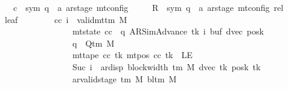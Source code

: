 \begin{isabellebody}
\ \ \ \ \ c{}\ {\isacharcolon}{\kern0pt}{\isacharcolon}{\kern0pt}\ {\isachardoublequoteopen}{\isacharparenleft}{\kern0pt}sym{}{\isacharcomma}{\kern0pt}\ {\isacharprime}{\kern0pt}q\ {\isasymtimes}\ {\isacharprime}{\kern0pt}a\ ar{\isacharunderscore}{\kern0pt}stage{\isacharparenright}{\kern0pt}\ mt{\isacharunderscore}{\kern0pt}config{\isachardoublequoteclose}\isanewline
\ \ \ \ \ R{\isacharprime}{\kern0pt}\ {\isacharcolon}{\kern0pt}{\isacharcolon}{\kern0pt}\ {\isachardoublequoteopen}{\isacharparenleft}{\kern0pt}sym{}{\isacharcomma}{\kern0pt}\ {\isacharprime}{\kern0pt}q\ {\isasymtimes}\ {\isacharprime}{\kern0pt}a\ ar{\isacharunderscore}{\kern0pt}stage{\isacharparenright}{\kern0pt}\ mt{\isacharunderscore}{\kern0pt}config\ rel{\isachardoublequoteclose}\isanewline
\ \ \ leaf{\isacharcolon}{\kern0pt}\isanewline
\ \ \ \ \ \ \ \ {\isachardoublequoteopen}{\isasymAnd}cc\ i{\isachardot}{\kern0pt}\ {\isasymlbrakk}\ valid{\isacharunderscore}{\kern0pt}mttm\ M{\isacharsemicolon}{\kern0pt}\isanewline
\ \ \ \ \ \ \ \ \ \ \ \ \ \ \ \ \ \ \ mt{\isacharunderscore}{\kern0pt}state\ cc\ {\isacharequal}{\kern0pt}\ {\isacharparenleft}{\kern0pt}q{\isacharcomma}{\kern0pt}\ AR{\isacharunderscore}{\kern0pt}SimAdvance{\isacharcomma}{\kern0pt}\ tk{\isacharcomma}{\kern0pt}\ i{\isacharcomma}{\kern0pt}\ buf{\isacharcomma}{\kern0pt}\ dvec{\isacharcomma}{\kern0pt}\ posk{\isacharparenright}{\kern0pt}{\isacharsemicolon}{\kern0pt}\isanewline
\ \ \ \ \ \ \ \ \ \ \ \ \ \ \ \ \ \ \ q\ {\isasymin}\ Q{\isacharunderscore}{\kern0pt}tm\ M{\isacharsemicolon}{\kern0pt}\isanewline
\ \ \ \ \ \ \ \ \ \ \ \ \ \ \ \ \ \ \ mt{\isacharunderscore}{\kern0pt}tape\ cc\ tk\ {\isacharparenleft}{\kern0pt}mt{\isacharunderscore}{\kern0pt}pos\ cc\ tk{\isacharparenright}{\kern0pt}\ {\isasymnoteq}\ LE{}{\isacharsemicolon}{\kern0pt}\isanewline
\ \ \ \ \ \ \ \ \ \ \ \ \ \ \ \ \ \ \ Suc\ i\ {\isacharless}{\kern0pt}\ ar{\isacharunderscore}{\kern0pt}disp\ {\isacharparenleft}{\kern0pt}block{\isacharunderscore}{\kern0pt}width\ {\isacharparenleft}{\kern0pt}{\isasymGamma}{\isacharunderscore}{\kern0pt}tm\ M{\isacharparenright}{\kern0pt}{\isacharparenright}{\kern0pt}\ {\isacharparenleft}{\kern0pt}dvec\ tk{\isacharparenright}{\kern0pt}\ {\isacharparenleft}{\kern0pt}posk\ tk{\isacharparenright}{\kern0pt}{\isacharsemicolon}{\kern0pt}\isanewline
\ \ \ \ \ \ \ \ \ \ \ \ \ \ \ \ \ \ \ ar{\isacharunderscore}{\kern0pt}valid{\isacharunderscore}{\kern0pt}stage\ {\isacharparenleft}{\kern0pt}{\isasymGamma}{\isacharunderscore}{\kern0pt}tm\ M{\isacharparenright}{\kern0pt}\ {\isacharparenleft}{\kern0pt}bl{\isacharunderscore}{\kern0pt}tm\ M{\isacharparenright}{\kern0pt}\isanewline

\end{isabellebody}

